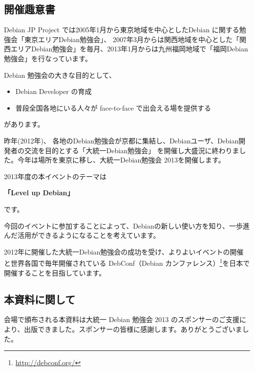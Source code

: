 \documentclass[mingoth,a4paper,twoside]{jsarticle}
\begin{document}

\subsection*{開催趣意書}

Debian JP Project では2005年1月から東京地域を中心としたDebian に関する勉強会「東京エリアDebian勉強会」、
2007年3月からは関西地域を中心とした「関西エリアDebian勉強会」を毎月、2013年1月からは九州福岡地域で「福岡Debian勉強会」を行なっています。


\vspace{1zw}
Debian 勉強会の大きな目的として、
\begin{itemize}
\item Debian Developer の育成
\item 普段全国各地にいる人々が face-to-face で出会える場を提供する
\end{itemize}
があります。

\vspace{1zw}
昨年(2012年)、
各地のDebian勉強会が京都に集結し、Debianユーザ、Debian開発者の交流を目的とする「大統一Debian勉強会」
を開催し大盛況に終わりました。今年は場所を東京に移し、大統一Debian勉強会 2013を開催します。

\vspace{1zw}
2013年度の本イベントのテーマは
\begin{center}
  {\bf{「Level up Debian」}}
\end{center}
です。

\vspace{1zw}
今回のイベントに参加することによって、Debianの新しい使い方を知り、一歩進んだ活用ができるようになることを考えています。

\vspace{1zw}
2012年に開催した大統一Debian勉強会の成功を受け、よりよいイベントの開催と世界各国で毎年開催されている DebConf（Debian カンファレンス）\footnote{\url{http://debconf.org/}}を日本で開催することを目指しています。

\pagebreak

\subsection*{本資料に関して}

会場で頒布される本資料は大統一 Debian 勉強会 2013 のスポンサーのご支援に
より、出版できました。スポンサーの皆様に感謝します。ありがとうございまし
た。
\end{document}
